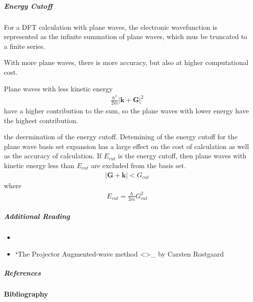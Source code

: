 \documentclass[letterpaper,10pt,english]{sphinxmanual}
\begin{document}
\subparagraph{Energy Cutoff}
\label{\detokenize{dft/dft_paw:energy-cutoff}}
For a DFT calculation with plane waves, the electronic wavefunction is represented as the infinite summation of plane waves, which mus be truncated to a finite series.

With more plane waves, there is more accuracy, but also at higher computational cost.

Plane waves with less kinetic energy
\begin{equation*}
\begin{split}\frac{\hbar^2}{2m}\lvert \bm{k} + \bm{G} \rvert^2\end{split}
\end{equation*}
have a higher contribution to the sum, so the plane waves with lower energy have the highest contribution.

the deermination of the energy cutoff.
Detemining of the energy cutoff for the plane wave basis set expansion has a large effect on the cost of calculation as well as the accuracy of calculation.  If \(E_{cut}\) is the energy cutoff, then plane waves with kinetic energy less than \(E_{cut}\) are excluded from the basis set.
\begin{equation*}
\begin{split}\lvert \mathbf{G}+\mathbf{k} \rvert < G_{cut}\end{split}
\end{equation*}
where
\begin{equation*}
\begin{split}E_{cut}=\frac{\hbar}{2m}G^2_{cut}\end{split}
\end{equation*}

\subparagraph{Additional Reading}
\label{\detokenize{dft/dft_paw:additional-reading}}\begin{itemize}
\item {} 

\item {} 
{\color{red}\bfseries{}{}`}The Projector Augmented-wave method \textless{}\textgreater{}\_ by Carsten Rostgaard

\end{itemize}


\subparagraph{References}
\label{\detokenize{dft/dft_paw:references}}

\paragraph{Bibliography}
\label{\detokenize{dft/index:bibliography}}
\end{document}
